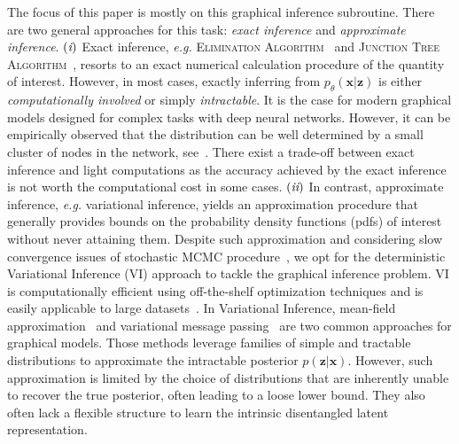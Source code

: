 \documentclass[twoside]{article}
\newcommand{\RN}[1]{%
	\textup{\lowercase\expandafter{\it \romannumeral#1}}%
}
\begin{document}
The focus of this paper is mostly on this graphical inference subroutine. 
There are two general approaches for this task: \textit{exact inference} and \textit{approximate inference}. $(\RN{1})$ Exact inference, \textit{e.g.} \textsc{Elimination Algorithm}~\cite{sanner2012symbolic} and \textsc{Junction Tree Algorithm}~\cite{kahle2008junction}, resorts to an exact numerical calculation procedure of the quantity of interest. 
However, in most cases, exactly inferring from $p_{\theta}(\mathbf{x}|\mathbf{z})$ is either \emph{computationally involved} or simply \emph{intractable}. 
It is the case for modern graphical models designed for complex tasks with deep neural networks.
However, it can be empirically observed that the distribution can be well determined by a small cluster of nodes in the network, see~\cite{jordan1999introduction}. 
There exist a trade-off between exact inference and light computations as the accuracy achieved by the exact inference is not worth the computational cost in some cases.
$(\RN{2})$ In contrast, approximate inference, \textit{e.g.} variational inference, yields an approximation procedure that generally provides bounds on the probability density functions (pdfs) of interest without never attaining them.
Despite such approximation and considering slow convergence issues of stochastic MCMC procedure~\cite{salimans2015markov}, we opt for the deterministic Variational Inference (VI) approach to tackle the graphical inference problem.
VI is computationally efficient using off-the-shelf optimization techniques and is easily applicable to large datasets~\cite{hoffman2013stochastic, kingma2013auto, liu2016stein}.
In Variational Inference, mean-field approximation~\cite{xing2012generalized} and variational message passing~\cite{winn2005variational} are two common approaches for graphical models.
Those methods leverage families of simple and tractable distributions to approximate the intractable posterior $p(\mathbf{z}|\mathbf{x})$.
However, such approximation is limited by the choice of distributions that are inherently unable to recover the true posterior, often leading to a loose lower bound. They also often lack a flexible structure to learn the intrinsic disentangled latent representation. 
\end{document}
